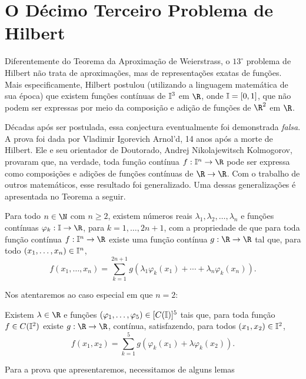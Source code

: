 \section{O Décimo Terceiro Problema de Hilbert}

Diferentemente do Teorema da Aproximação de Weierstrass, o \( 13^{ \circ } \) problema de Hilbert não trata de aproximações, mas de representações exatas de funções.
Mais especificamente, Hilbert postulou (utilizando a linguagem matemática de sua época) que existem funções contínuas de \( \mathbb{I}^{ 3 } \) em \( \R \), onde \( \mathbb{I} = [0, 1] \), que não podem ser expressas por meio da composição e adição de funções de \( \R^{ 2 } \) em \( \R \).

Décadas após ser postulada, essa conjectura eventualmente foi demonstrada \emph{falsa}.
A prova foi dada por Vladimir Igorevich Arnol'd, 14 anos após a morte de Hilbert.
Ele e seu orientador de Doutorado, Andrej Nikolajewitsch Kolmogorov, provaram que, na verdade, toda função contínua \( f : \I^{ n } \to \R \) pode ser expressa como composições e adições de funções contínuas de \( \R \to \R \).
Com o trabalho de outros matemáticos, esse resultado foi generalizado.
Uma dessas generalizações é apresentada no Teorema a seguir.
\begin{teo}
    Para todo \( n \in \N \) com \( n \geq 2 \), existem números reais \( \lambda_{ 1 }, \lambda_{ 2 }, \dots, \lambda_{ n } \) e funções contínuas \( \varphi_{ k } : \I \to \R \), para \( k = 1, \dots, 2n + 1 \), com a propriedade de que para toda função contínua \( f : \I^{ n } \to \R \) existe uma função contínua \( g : \R \to \R \) tal que, para todo \( ( x_{ 1 }, \dots, x_{ n } ) \in \mathbb{I}^{ n } \),
    \begin{equation}
        f(x_{ 1 }, \dots, x_{ n }) =
        \sum_{ k=1 }^{ 2n+1 } g ( \lambda_{ 1 } \varphi_{ k } ( x_{ 1 } )  + \cdots + \lambda_{ n } \varphi_{ k } ( x_{ n } ) )
        \label{eq: kolmogorov_2}
    .\end{equation}
\end{teo}

Nos atentaremos ao caso especial em que \( n = 2 \):

\begin{teo}
    Existem \( \lambda \in \R \) e funções \( ( \varphi_{ 1 }, \dots, \varphi_{ 5 } ) \in [C(\mathbb{I})]^{ 5 } \) tais que, para toda função \( f \in C(\mathbb{I}^{ 2 }) \) existe \( g : \R \to \R \), contínua, satisfazendo, para todos \( ( x_{ 1 }, x_{ 2 } ) \in \mathbb{I}^{ 2 } \), \[
        f ( x_{ 1 }, x_{ 2 } ) =
        \sum_{ k=1 }^{ 5 } g ( \varphi_{ k } ( x_{ 1 } ) + \lambda \varphi_{ k } ( x_{ 2 } ) )
    .\]
\end{teo}

Para a prova que apresentaremos, necessitamos de alguns lemas
 